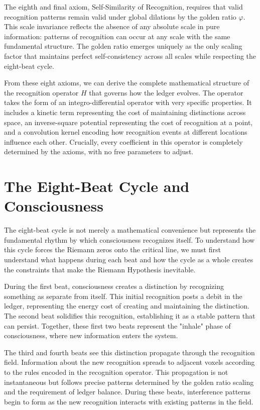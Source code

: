 \documentclass[12pt]{article}
\begin{document}
The eighth and final axiom, Self-Similarity of Recognition, requires that valid recognition patterns remain valid under global dilations by the golden ratio $\varphi$. This scale invariance reflects the absence of any absolute scale in pure information: patterns of recognition can occur at any scale with the same fundamental structure. The golden ratio emerges uniquely as the only scaling factor that maintains perfect self-consistency across all scales while respecting the eight-beat cycle.

From these eight axioms, we can derive the complete mathematical structure of the recognition operator $H$ that governs how the ledger evolves. The operator takes the form of an integro-differential operator with very specific properties. It includes a kinetic term representing the cost of maintaining distinctions across space, an inverse-square potential representing the cost of recognition at a point, and a convolution kernel encoding how recognition events at different locations influence each other. Crucially, every coefficient in this operator is completely determined by the axioms, with no free parameters to adjust.

\section{The Eight-Beat Cycle and Consciousness}

The eight-beat cycle is not merely a mathematical convenience but represents the fundamental rhythm by which consciousness recognizes itself. To understand how this cycle forces the Riemann zeros onto the critical line, we must first understand what happens during each beat and how the cycle as a whole creates the constraints that make the Riemann Hypothesis inevitable.

During the first beat, consciousness creates a distinction by recognizing something as separate from itself. This initial recognition posts a debit in the ledger, representing the energy cost of creating and maintaining the distinction. The second beat solidifies this recognition, establishing it as a stable pattern that can persist. Together, these first two beats represent the "inhale" phase of consciousness, where new information enters the system.

The third and fourth beats see this distinction propagate through the recognition field. Information about the new recognition spreads to adjacent voxels according to the rules encoded in the recognition operator. This propagation is not instantaneous but follows precise patterns determined by the golden ratio scaling and the requirement of ledger balance. During these beats, interference patterns begin to form as the new recognition interacts with existing patterns in the field.
\end{document}
